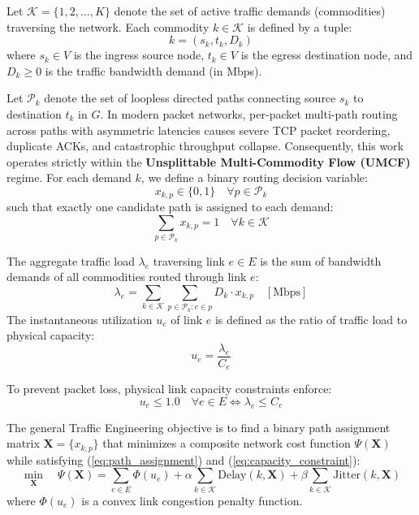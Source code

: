 \documentclass[12pt,a4paper,oneside]{report}
\begin{document}
Let $\mathcal{K} = \{1, 2, \dots, K\}$ denote the set of active traffic demands (commodities) traversing the network. Each commodity $k \in \mathcal{K}$ is defined by a tuple:
\begin{equation}
k = \left( s_k, t_k, D_k \right)
\end{equation}
where $s_k \in V$ is the ingress source node, $t_k \in V$ is the egress destination node, and $D_k \ge 0$ is the traffic bandwidth demand (in Mbps).

Let $\mathcal{P}_k$ denote the set of loopless directed paths connecting source $s_k$ to destination $t_k$ in $G$. In modern packet networks, per-packet multi-path routing across paths with asymmetric latencies causes severe TCP packet reordering, duplicate ACKs, and catastrophic throughput collapse. Consequently, this work operates strictly within the \textbf{Unsplittable Multi-Commodity Flow (UMCF)} regime. For each demand $k$, we define a binary routing decision variable:
\begin{equation}
x_{k, p} \in \{0, 1\} \quad \forall p \in \mathcal{P}_k
\end{equation}
such that exactly one candidate path is assigned to each demand:
\begin{equation}
\label{eq:path_assignment}
\sum_{p \in \mathcal{P}_k} x_{k, p} = 1 \quad \forall k \in \mathcal{K}
\end{equation}

The aggregate traffic load $\lambda_e$ traversing link $e \in E$ is the sum of bandwidth demands of all commodities routed through link $e$:
\begin{equation}
\lambda_e = \sum_{k \in \mathcal{K}} \sum_{p \in \mathcal{P}_k : e \in p} D_k \cdot x_{k, p} \quad [\text{Mbps}]
\end{equation}
The instantaneous utilization $u_e$ of link $e$ is defined as the ratio of traffic load to physical capacity:
\begin{equation}
u_e = \frac{\lambda_e}{C_e}
\end{equation}

To prevent packet loss, physical link capacity constraints enforce:
\begin{equation}
\label{eq:capacity_constraint}
u_e \le 1.0 \quad \forall e \in E \iff \lambda_e \le C_e
\end{equation}

The general Traffic Engineering objective is to find a binary path assignment matrix $\mathbf{X} = \{x_{k, p}\}$ that minimizes a composite network cost function $\Psi(\mathbf{X})$ while satisfying (\ref{eq:path_assignment}) and (\ref{eq:capacity_constraint}):
\begin{equation}
\min_{\mathbf{X}} \quad \Psi(\mathbf{X}) = \sum_{e \in E} \Phi(u_e) + \alpha \sum_{k \in \mathcal{K}} \text{Delay}(k, \mathbf{X}) + \beta \sum_{k \in \mathcal{K}} \text{Jitter}(k, \mathbf{X})
\end{equation}
where $\Phi(u_e)$ is a convex link congestion penalty function.
\end{document}
